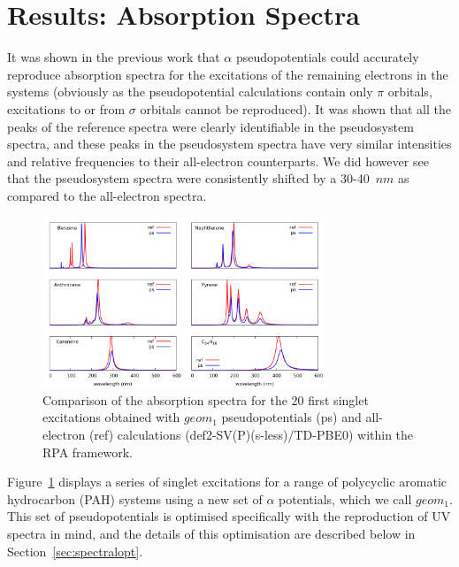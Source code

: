 \documentclass[aip,reprint,nofootinbib]{revtex4-1}
\begin{document}
\section{Results: Absorption Spectra}
\label{sec:pseudospectra}

It was shown in the previous work that $\alpha$ pseudopotentials could accurately reproduce absorption spectra for the excitations of the remaining electrons in the systems (obviously as the pseudopotential calculations contain only $\pi$ orbitals, excitations to or from $\sigma$ orbitals cannot be reproduced). It was shown that all the peaks of the reference spectra were clearly identifiable in the pseudosystem spectra, and these peaks in the pseudosystem spectra have very similar intensities and relative frequencies to their all-electron counterparts. We did however see that the pseudosystem spectra were consistently shifted by a 30-40~$nm$ as compared to the all-electron spectra.

\begin{figure}
\begin{center}
\includegraphics[width=8.5cm]{rings_geom1_rpas}
\end{center}
\caption[PAH and pseudo-PAH UV spectra: $geom_1$]{Comparison of the absorption spectra for the 20 first singlet excitations obtained with
$geom_1$ pseudopotentials (ps) and all-electron (ref) calculations (def2-SV(P)(s-less)/TD-PBE0) within the RPA
framework.}\label{fig:rings_geom1_rpas}
\end{figure}

Figure~\ref{fig:rings_geom1_rpas} displays a series of singlet excitations for a range of polycyclic aromatic hydrocarbon (PAH) systems using a new set of $\alpha$ potentials, which we call $geom_1$. This set of pseudopotentials is optimised specifically with the reproduction of UV spectra in mind, and the details of this optimisation are described below in Section~\ref{sec:spectralopt}.
\end{document}
